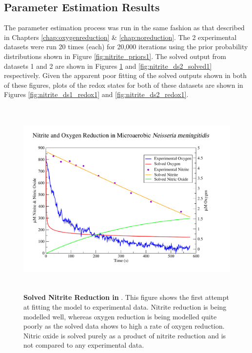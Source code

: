 \subsection{Parameter Estimation Results}
The parameter estimation process was run in the same fashion as that described in Chapters \ref{chap:oxygenreduction} \& \ref{chap:noreduction}. The 2 experimental datasets were run 20 times (each) for 20,000 iterations using the prior probability distributions shown in Figure \ref{fig:nitrite_priors1}. The solved output from datasets 1 and 2 are shown in Figures \ref{fig:nitrite_ds1_solved1} and \ref{fig:nitrite_ds2_solved1} respectively. Given the apparent poor fitting of the solved outputs shown in both of these figures, plots of the redox states for both of these datasets are shown in Figures \ref{fig:nitrite_ds1_redox1} and \ref{fig:nitrite_ds2_redox1}.

\begin{figure}[tbp]
 \centering
 \includegraphics[height=10cm, trim=1cm 1cm 3cm 1cm, clip=true]{./07-nitritereduction/data/dataset1-1.pdf}
 \caption[Solved Nitrite Reduction in \Nsm{}]{{\bf Solved Nitrite Reduction in \Nsm{}}. This figure shows the first attempt at fitting the model to experimental data. Nitrite reduction is being modelled well, whereas oxygen reduction is being modelled quite poorly as the solved data shows to high a rate of oxygen reduction. Nitric oxide is solved purely as a product of nitrite reduction and is not compared to any experimental data.
  \label{fig:nitrite_ds1_solved1}}
\end{figure}

